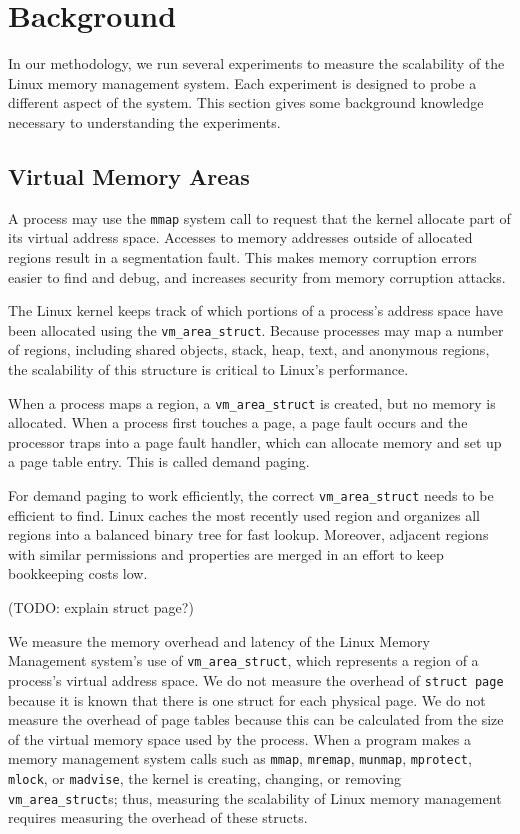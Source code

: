 \documentclass[twocolumn,11pt]{article}
\begin{document}
\section{Background}

In our methodology, we run several experiments to measure the scalability of
the Linux memory management system. Each experiment is designed to probe a
different aspect of the system. This section gives some background knowledge
necessary to understanding the experiments.

\subsection{Virtual Memory Areas}

A process may use the \texttt{mmap} system call to request that the kernel
allocate part of its virtual address space. Accesses to memory addresses
outside of allocated regions result in a segmentation fault. This makes memory
corruption errors easier to find and debug, and increases security from memory
corruption attacks.

The Linux kernel keeps track of which portions of a process's address space
have been allocated using the \texttt{vm\_area\_struct}. Because processes may
map a number of regions, including shared objects, stack, heap, text, and
anonymous regions, the scalability of this structure is critical to Linux's
performance.

When a process maps a region, a \texttt{vm\_area\_struct} is created, but no
memory is allocated. When a process first touches a page, a page fault occurs
and the processor traps into a page fault handler, which can allocate memory
and set up a page table entry. This is called demand paging.

For demand paging to work efficiently, the correct \texttt{vm\_area\_struct}
needs to be efficient to find. Linux caches the most recently used region and
organizes all regions into a balanced binary tree for fast lookup.  Moreover,
adjacent regions with similar permissions and properties are merged in an
effort to keep bookkeeping costs low.

(TODO: explain struct page?)

We measure the memory overhead and latency of the Linux Memory Management
system's use of \texttt{vm\_area\_struct}, which represents a region of a
process's virtual address space.  
We do not measure the overhead of \texttt{struct page} because it is known that
there is one struct for each physical page. We do not measure the overhead of
page tables because this can be calculated from the size of the virtual memory
space used by the process.  When a program makes a memory management system
calls such as \texttt{mmap}, \texttt{mremap}, \texttt{munmap},
\texttt{mprotect}, \texttt{mlock}, or \texttt{madvise}, the kernel is creating,
changing, or removing \texttt{vm\_area\_struct}s; thus, measuring the
scalability of Linux memory management requires measuring the overhead of these
structs.
\end{document}
